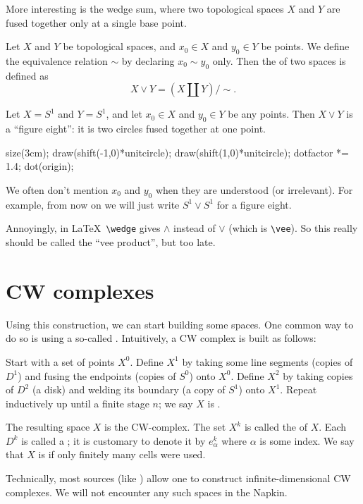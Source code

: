 More interesting is the wedge sum, where two topological spaces $X$
and $Y$ are fused together only at a single base point.
\begin{definition}
	Let $X$ and $Y$ be topological spaces, and $x_0 \in X$ and $y_0 \in Y$
	be points.
	We define the equivalence relation $\sim$ by declaring $x_0 \sim y_0$ only.
	Then the  of two spaces is defined as
	\[ X \vee Y = (X \amalg Y) / {\sim}. \]
\end{definition}

\begin{example}
	Let $X = S^1$ and $Y = S^1$,
	and let $x_0 \in X$ and $y_0 \in Y$ be any points.
	Then $X \vee Y$ is a ``figure eight'': it is two
	circles fused together at one point.
	\begin{center}
		\begin{asy}
			size(3cm);
			draw(shift(-1,0)*unitcircle);
			draw(shift(1,0)*unitcircle);
			dotfactor *= 1.4;
			dot(origin);
		\end{asy}
	\end{center}
\end{example}
\begin{abuse}
	We often don't mention $x_0$ and $y_0$ when they are understood
	(or irrelevant).  For example, from now on we will just
	write $S^1 \vee S^1$ for a figure eight.
\end{abuse}

\begin{remark}
	Annoyingly, in \LaTeX\ \verb+\wedge+ gives $\wedge$ instead
	of $\vee$ (which is \verb+\vee+).
	So this really should be called the ``vee product'', but too late.
\end{remark}


\section{CW complexes}
Using this construction, we can start building some spaces.
One common way to do so is using a so-called .
Intuitively, a CW complex is built as follows:
\begin{itemize}
	\ii Start with a set of points $X^0$.
	\ii Define $X^1$ by taking some line segments (copies of $D^1$)
	and fusing the endpoints (copies of $S^0$) onto $X^0$.
	\ii Define $X^2$ by taking copies of $D^2$ (a disk)
	and welding its boundary (a copy of $S^1$) onto $X^1$.
	\ii Repeat inductively up until a finite stage $n$;
	we say $X$ is .
\end{itemize}
The resulting space $X$ is the CW-complex.
The set $X^k$ is called the  of $X$.
Each $D^k$ is called a ; it is customary to
denote it by $e_\alpha^k$ where $\alpha$ is some index.
We say that $X$ is  if only finitely many cells were used.
\begin{abuse}
	Technically, most sources (like \cite{ref:hatcher}) allow one to
	construct infinite-dimensional CW complexes.
	We will not encounter any such spaces in the Napkin.
\end{abuse}

